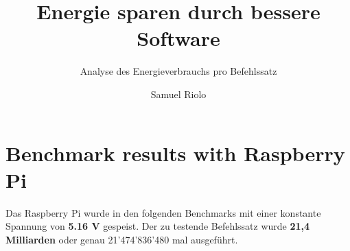 \documentclass{../template/ffhsthesis}
\begin{document}


\title{Energie sparen durch bessere Software}
\subtitle{Analyse des Energieverbrauchs pro Befehlssatz} %
\author{Samuel Riolo}


\maketitle



\startThesis
\chapter{Benchmark results with Raspberry Pi}
Das Raspberry Pi wurde in den folgenden Benchmarks mit einer konstante Spannung von \textbf{5.16 V} gespeist. Der zu testende Befehlssatz wurde \textbf{21,4 Milliarden} oder genau 21'474'836'480 mal ausgeführt.

\tikzset{every picture/.style=thick}
\end{document}
